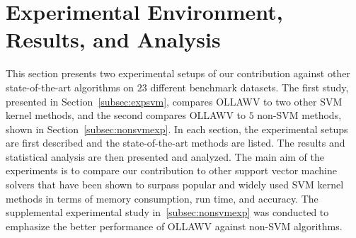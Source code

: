 \documentclass[reqno]{vcuthesis}
\numberwithin{equation}{chapter}
\begin{document}
\section{Experimental Environment, Results, and Analysis}\label{sec:exp}
This section presents two experimental setups of our contribution against other state-of-the-art algorithms on $23$ different benchmark datasets. The first study, presented in Section~\ref{subsec:expsvm}, compares OLLAWV to two other SVM kernel methods, and the second compares OLLAWV to $5$ non-SVM methods, shown in Section~\ref{subsec:nonsvmexp}. In each section, the experimental setups are first described and the state-of-the-art methods are listed. The results and statistical analysis are then presented and analyzed. The main aim of the experiments is to compare our contribution to other support vector machine solvers that have been shown to surpass popular and widely used SVM kernel methods in terms of memory consumption, run time, and accuracy. The supplemental experimental study in~\ref{subsec:nonsvmexp} was conducted to emphasize the better performance of OLLAWV against non-SVM algorithms.
\end{document}
